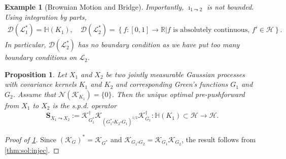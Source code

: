 \documentclass[noinfoline]{imsart}\setcounter{tocdepth}{2}
\renewcommand{\b}[1]{\mathbb{#1}} %
\newcommand{\m}[1]{\mathbf{#1}} %
\newcommand{\s}[1]{\mathscr{#1}} %
\renewcommand{\c}[1]{\mathcal{#1}} %
\newcommand{\rd}{\mathrm{d}} %
\theoremstyle{plain}
\newtheorem{proposition}[theorem]{Proposition}
\newtheorem{example}{Example}[section]
\begin{document}
\begin{example}[Brownian Motion and Bridge]
Importantly, $\imath_{1 \leadsto 2}$ is not bounded. 
Using integration by parts,
\begin{align*}
    \c{D}(\s{L}_{1}^{*}) = \b{H}(K_{1}), \quad 
    \c{D}(\s{L}_{2}^{*}) = \left\{ f:[0, 1] \rightarrow \b{R} \left. \right\vert f \text{ is absolutely continuous}, \,  f' \in \c{H} \right\}.
\end{align*}
In particular, $\c{D}(\s{L}_{2}^{*})$ has no boundary condition as we have put too many boundary conditions on $\s{L}_{2}$.
\end{example}

\begin{proposition}\label{prop:box:prod:opt}
Let $X_{1}$ and $X_{2}$ be two jointly measurable Gaussian processes with covariance kernels $K_{1}$ and $K_{2}$ and corresponding Green's functions $G_{1}$ and $G_{2}$. Assume that $\c{N}(\s{K}_{K_{1}}) = \{0\}$.  Then the unique optimal pre-pushforward from $X_{1}$ to $X_{2}$ is the s.p.d. operator
\begin{equation*}
    \m{S}_{X_{1} \leadsto X_{2}} := \s{K}_{G_{1}^{*}}^{\dagger} \s{K}_{(G_{1}^{*} \square K_{2} \square G_{1})^{1/2}} \s{K}_{G_{1}}^{\dagger}: \b{H}(K_{1}) \subset \c{H} \rightarrow \c{H}.
\end{equation*}
\end{proposition}


\begin{proof}[Proof of \cref{prop:box:prod:opt}]
Since $(\s{K}_{G})^{*} = \s{K}_{G^{*}}$ and $\s{K}_{G_{1} \square G_{2}} = \s{K}_{G_{1}} \s{K}_{G_{2}}$, the result follows from \cref{thm:sol:injec}.
\end{proof}
\end{document}
